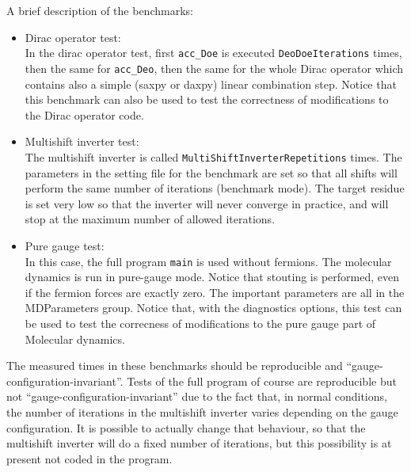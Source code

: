 A brief description of the benchmarks:
\begin{itemize}
 \item {Dirac operator test}: \\
In the dirac operator test, first \verb|acc_Doe| is executed \verb|DeoDoeIterations| 
times, then the same for \verb|acc_Deo|, then the same for the whole Dirac operator 
which contains also a simple ({\sf saxpy} or {\sf daxpy}) linear combination step.
Notice that this benchmark can also be used to test the correctness of modifications to the
Dirac operator code.
\item {Multishift inverter test}: \\
The multishift inverter is called \verb|MultiShiftInverterRepetitions| times.
The parameters in the setting file for the benchmark are set so that all shifts 
will perform the same number of iterations (benchmark mode). The target residue is set very low so that the 
inverter will never converge in practice, and will stop at the maximum number of allowed iterations.
\item {Pure gauge test}: \\
In this case, the full program \verb|main| is used without fermions. The molecular dynamics is run 
in pure-gauge mode. Notice that stouting is performed, even if the fermion forces are exactly zero.
The important parameters are all in the {\sf MDParameters} group.
Notice that, with the diagnostics options, this test can be used to test the correcness
of modifications to the pure gauge part of Molecular dynamics.
\end{itemize}

The measured times in these benchmarks should be reproducible and ``gauge-configuration-invariant''.
Tests of the full program of course are reproducible but not ``gauge-configuration-invariant'' due
to the fact that, in normal conditions, the number of iterations in the multishift inverter varies 
depending on the gauge configuration. It is possible to actually change that behaviour, so that 
the multishift inverter will do a fixed number of iterations, but this possibility is at present not coded 
in the program.
